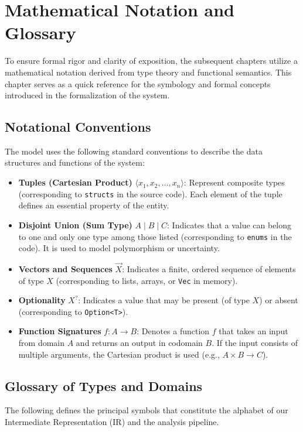 \chapter{Mathematical Notation and Glossary}
\label{apx:notation}

To ensure formal rigor and clarity of exposition, the subsequent chapters utilize a mathematical notation derived from type theory and functional semantics. This chapter serves as a quick reference for the symbology and formal concepts introduced in the formalization of the system.

\section{Notational Conventions}
The model uses the following standard conventions to describe the data structures and functions of the system:

\begin{itemize}
    \item \textbf{Tuples (Cartesian Product)} $\langle x_1, x_2, \dots, x_n \rangle$: Represent composite types (corresponding to \texttt{structs} in the source code). Each element of the tuple defines an essential property of the entity.
    \item \textbf{Disjoint Union (Sum Type)} $A \mid B \mid C$: Indicates that a value can belong to one and only one type among those listed (corresponding to \texttt{enums} in the code). It is used to model polymorphism or uncertainty.
    \item \textbf{Vectors and Sequences} $\vec{X}$: Indicates a finite, ordered sequence of elements of type $X$ (corresponding to lists, arrays, or \texttt{Vec} in memory).
    \item \textbf{Optionality} $X^?$: Indicates a value that may be present (of type $X$) or absent (corresponding to \texttt{Option<T>}).
    \item \textbf{Function Signatures} $f : A \to B$: Denotes a function $f$ that takes an input from domain $A$ and returns an output in codomain $B$. If the input consists of multiple arguments, the Cartesian product is used (e.g., $A \times B \to C$).
\end{itemize}

\section{Glossary of Types and Domains}
The following defines the principal symbols that constitute the alphabet of our Intermediate Representation (IR) and the analysis pipeline.

